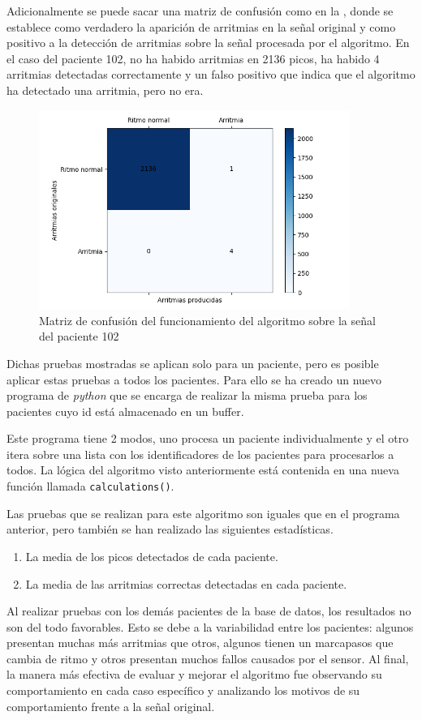 Adicionalmente se puede sacar una matriz de confusión como en la , donde se establece como verdadero la aparición de arritmias en la señal original y como positivo a la detección de arritmias sobre la señal procesada por el algoritmo. En el caso del paciente 102, no ha habido arritmias en 2136 picos, ha habido 4 arritmias detectadas correctamente y un falso positivo que indica que el algoritmo ha detectado una arritmia, pero no era.

\begin{figure}[h!]
	\centering
    \includegraphics[width=0.9\textwidth]{./Images/img_algoritmo/matrizdeconfusion.png}
    \caption[Matriz de confusión]{Matriz de confusión del funcionamiento del algoritmo sobre la señal del paciente 102}
    \label{fig:matrizdeconfusion}
\end{figure} 

Dichas pruebas mostradas se aplican solo para un paciente, pero es posible aplicar estas pruebas a todos los pacientes.
Para ello se ha creado un nuevo programa de \textit{python} que se encarga de realizar la misma prueba para los pacientes cuyo id está
almacenado en un buffer.

Este programa tiene 2 modos, uno procesa un paciente individualmente y el otro itera sobre una lista con los identificadores de los pacientes para procesarlos a todos. La lógica del algoritmo visto anteriormente está contenida en una nueva función llamada \texttt{calculations()}.

Las pruebas que se realizan para este algoritmo son iguales que en el programa anterior, pero también
se han realizado las siguientes estadísticas.

\begin{enumerate}
	\item La media de los picos detectados de cada paciente.
	\item La media de las arritmias correctas detectadas en cada paciente.
\end{enumerate} 

Al realizar pruebas con los demás pacientes de la base de datos, los resultados no son del todo favorables. Esto se debe a la variabilidad entre los pacientes: algunos presentan muchas más arritmias que otros, algunos tienen un marcapasos que cambia de ritmo y otros presentan muchos fallos causados por el sensor. Al final, la manera más efectiva de evaluar y mejorar el algoritmo fue observando su comportamiento en cada caso específico y analizando los motivos de su comportamiento frente a la señal original.